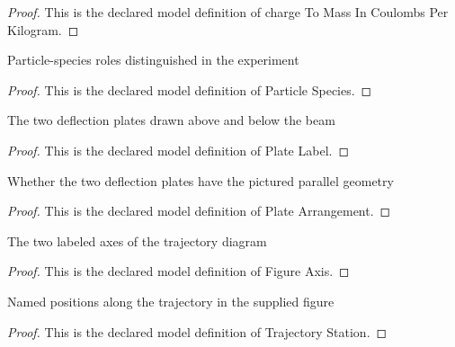 \begin{proof}
  This is the declared model definition of charge To Mass In Coulombs Per Kilogram.
\end{proof}
\begin{definition}
  \label{def:physics:phyx-mini-0561:phyxminiproblems-problemphyxmini0561-particlespecies}
  Particle-species roles distinguished in the experiment
\end{definition}
\begin{proof}
  This is the declared model definition of Particle Species.
\end{proof}
\begin{definition}
  \label{def:physics:phyx-mini-0561:phyxminiproblems-problemphyxmini0561-platelabel}
  The two deflection plates drawn above and below the beam
\end{definition}
\begin{proof}
  This is the declared model definition of Plate Label.
\end{proof}
\begin{definition}
  \label{def:physics:phyx-mini-0561:phyxminiproblems-problemphyxmini0561-platearrangement}
  Whether the two deflection plates have the pictured parallel geometry
\end{definition}
\begin{proof}
  This is the declared model definition of Plate Arrangement.
\end{proof}
\begin{definition}
  \label{def:physics:phyx-mini-0561:phyxminiproblems-problemphyxmini0561-figureaxis}
  The two labeled axes of the trajectory diagram
\end{definition}
\begin{proof}
  This is the declared model definition of Figure Axis.
\end{proof}
\begin{definition}
  \label{def:physics:phyx-mini-0561:phyxminiproblems-problemphyxmini0561-trajectorystation}
  Named positions along the trajectory in the supplied figure
\end{definition}
\begin{proof}
  This is the declared model definition of Trajectory Station.
\end{proof}
